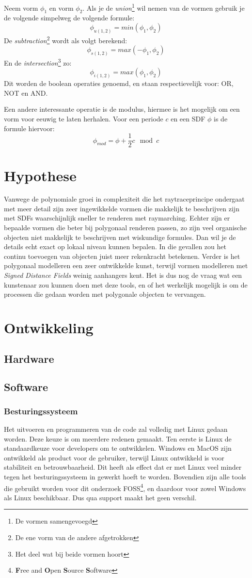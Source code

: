 \documentclass[12pt, a4paper]{article}
\begin{document}
Neem vorm $\phi_1$ en vorm $\phi_2$. Als je de \emph{union}\footnote{De vormen samengevoegd} wil nemen van de vormen gebruik je de volgende simpelweg de volgende formule: 
\[\phi_{u(1,2)}=min(\phi_1, \phi_2)\]
De \emph{subtraction}\footnote{De ene vorm van de andere afgetrokken} wordt als volgt berekend:
\[\phi_{s(1,2)}=max(-\phi_1, \phi_2)\]
En de \emph{intersection}\footnote{Het deel wat bij beide vormen hoort} zo:
\[\phi_{i(1,2)}=max(\phi_1, \phi_2)\]
Dit worden de boolean operaties genoemd, en staan respectievelijk voor: OR, NOT en AND.

Een andere interessante operatie is de modulus, hiermee is het mogelijk om een vorm voor eeuwig te laten herhalen. Voor een periode $c$ en een SDF $\phi$ is de formule hiervoor:
\[\phi_{mod}= \phi +\frac{1}{2}c\mod{c}\]

\clearpage
\section{Hypothese}
Vanwege de polynomiale groei in complexiteit die het raytraceprincipe ondergaat met meer detail zijn zeer ingewikkelde vormen die makkelijk te beschrijven zijn met SDFs waarschijnlijk sneller te renderen met raymarching. Echter zijn er bepaalde vormen die beter bij polygonaal renderen passen, zo zijn veel organische objecten niet makkelijk te beschrijven met wiskundige formules. Dan wil je de details echt exact op lokaal niveau kunnen bepalen. In die gevallen zou het continu toevoegen van objecten juist meer rekenkracht betekenen. Verder is het polygonaal modelleren een zeer ontwikkelde kunst, terwijl vormen modelleren met \emph{Signed Distance Fields} weinig aanhangers kent. Het is dus nog de vraag wat een kunstenaar zou kunnen doen met deze tools, en of het werkelijk mogelijk is om de processen die gedaan worden met polygonale objecten te vervangen.
\clearpage
\section{Ontwikkeling}
\subsection{Hardware}
\subsection{Software}
\subsubsection{Besturingssysteem}
Het uitvoeren en programmeren van de code zal volledig met Linux gedaan worden. Deze keuze is om meerdere redenen gemaakt. Ten eerste is Linux de standaardkeuze voor developers om te ontwikkelen. Windows en MacOS zijn ontwikkeld als product voor de gebruiker, terwijl Linux ontwikkeld is voor stabiliteit en betrouwbaarheid. Dit heeft als effect dat er met Linux veel minder tegen het besturingssysteem in gewerkt hoeft te worden. Bovendien zijn alle tools die gebruikt worden voor dit onderzoek FOSS\footnote{\textbf{F}ree and \textbf{O}pen \textbf{S}ource \textbf{S}oftware}, en daardoor voor zowel Windows als Linux beschikbaar. Dus qua support maakt het geen verschil.
\end{document}
